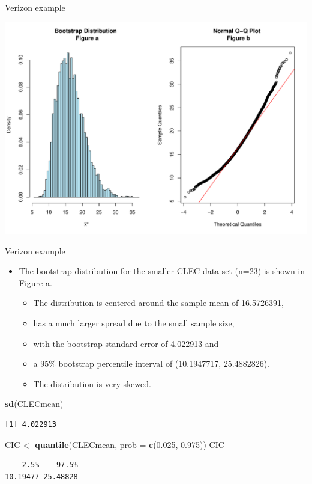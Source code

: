 \documentclass[
  ignorenonframetext,
]{beamer}
\newenvironment{Shaded}{\begin{snugshade}}{\end{snugshade}}
\newcommand{\AttributeTok}[1]{\textcolor[rgb]{0.13,0.29,0.53}{#1}}
\newcommand{\FloatTok}[1]{\textcolor[rgb]{0.00,0.00,0.81}{#1}}
\newcommand{\FunctionTok}[1]{\textcolor[rgb]{0.13,0.29,0.53}{\textbf{#1}}}
\newcommand{\NormalTok}[1]{#1}
\newcommand{\OtherTok}[1]{\textcolor[rgb]{0.56,0.35,0.01}{#1}}
\providecommand{\tightlist}{%
  \setlength{\itemsep}{0pt}\setlength{\parskip}{0pt}}
\begin{document}
\begin{frame}[fragile]{Verizon example}
\begin{center}\includegraphics[width=0.6\linewidth,height=0.35\textheight]{Week10_Lect_files/figure-beamer/unnamed-chunk-34-1} \end{center}
\normalsize
\end{frame}

\begin{frame}[fragile]{Verizon example}
\protect\hypertarget{verizon-example-5}{}
\begin{itemize}
\item
  The bootstrap distribution for the smaller CLEC data set (n=23) is
  shown in Figure a.

  \begin{itemize}
  \tightlist
  \item
    The distribution is centered around the sample mean of 16.5726391,
  \item
    has a much larger spread due to the small sample size,
  \item
    with the bootstrap standard error of 4.022913 and
  \item
    a \(95\%\) bootstrap percentile interval of (10.1947717,
    25.4882826).
  \item
    The distribution is very skewed.
  \end{itemize}
\end{itemize}

\tiny

\begin{Shaded}
\begin{Highlighting}[]
\FunctionTok{sd}\NormalTok{(CLECmean)}
\end{Highlighting}
\end{Shaded}

\begin{verbatim}
[1] 4.022913
\end{verbatim}

\begin{Shaded}
\begin{Highlighting}[]
\NormalTok{CIC }\OtherTok{\textless{}{-}} \FunctionTok{quantile}\NormalTok{(CLECmean, }\AttributeTok{prob =} \FunctionTok{c}\NormalTok{(}\FloatTok{0.025}\NormalTok{, }\FloatTok{0.975}\NormalTok{))}
\NormalTok{CIC}
\end{Highlighting}
\end{Shaded}

\begin{verbatim}
    2.5%    97.5% 
10.19477 25.48828 
\end{verbatim}

\normalsize
\end{frame}
\end{document}
